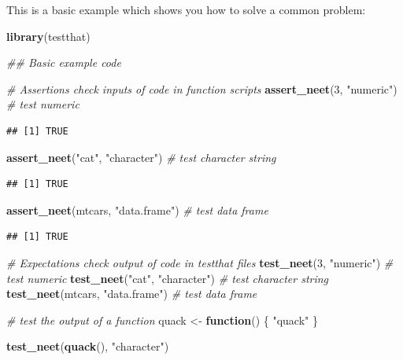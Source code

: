 \documentclass[
]{article}
\newenvironment{Shaded}{\begin{snugshade}}{\end{snugshade}}
\newcommand{\CommentTok}[1]{\textcolor[rgb]{0.56,0.35,0.01}{\textit{#1}}}
\newcommand{\ControlFlowTok}[1]{\textcolor[rgb]{0.13,0.29,0.53}{\textbf{#1}}}
\newcommand{\DecValTok}[1]{\textcolor[rgb]{0.00,0.00,0.81}{#1}}
\newcommand{\KeywordTok}[1]{\textcolor[rgb]{0.13,0.29,0.53}{\textbf{#1}}}
\newcommand{\NormalTok}[1]{#1}
\newcommand{\StringTok}[1]{\textcolor[rgb]{0.31,0.60,0.02}{#1}}
\begin{document}
This is a basic example which shows you how to solve a common problem:

\begin{Shaded}
\begin{Highlighting}[]
\KeywordTok{library}\NormalTok{(testthat)}

\CommentTok{\#\# Basic example code}

\CommentTok{\# Assertions check inputs of code in function scripts}
\KeywordTok{assert\_neet}\NormalTok{(}\DecValTok{3}\NormalTok{, }\StringTok{"numeric"}\NormalTok{) }\CommentTok{\# test numeric}
\end{Highlighting}
\end{Shaded}

\begin{verbatim}
## [1] TRUE
\end{verbatim}

\begin{Shaded}
\begin{Highlighting}[]
\KeywordTok{assert\_neet}\NormalTok{(}\StringTok{"cat"}\NormalTok{, }\StringTok{"character"}\NormalTok{) }\CommentTok{\# test character string}
\end{Highlighting}
\end{Shaded}

\begin{verbatim}
## [1] TRUE
\end{verbatim}

\begin{Shaded}
\begin{Highlighting}[]
\KeywordTok{assert\_neet}\NormalTok{(mtcars, }\StringTok{"data.frame"}\NormalTok{) }\CommentTok{\# test data frame}
\end{Highlighting}
\end{Shaded}

\begin{verbatim}
## [1] TRUE
\end{verbatim}

\begin{Shaded}
\begin{Highlighting}[]
\CommentTok{\# Expectations check output of code in testthat files}
\KeywordTok{test\_neet}\NormalTok{(}\DecValTok{3}\NormalTok{, }\StringTok{"numeric"}\NormalTok{) }\CommentTok{\# test numeric}
\KeywordTok{test\_neet}\NormalTok{(}\StringTok{"cat"}\NormalTok{, }\StringTok{"character"}\NormalTok{) }\CommentTok{\# test character string}
\KeywordTok{test\_neet}\NormalTok{(mtcars, }\StringTok{"data.frame"}\NormalTok{) }\CommentTok{\# test data frame}

\CommentTok{\# test the output of a function}
\NormalTok{quack <{-}}\StringTok{ }\ControlFlowTok{function}\NormalTok{() \{}
  \StringTok{"quack"}
\NormalTok{\}}

\KeywordTok{test\_neet}\NormalTok{(}\KeywordTok{quack}\NormalTok{(), }\StringTok{"character"}\NormalTok{)}
\end{Highlighting}
\end{Shaded}
\end{document}
